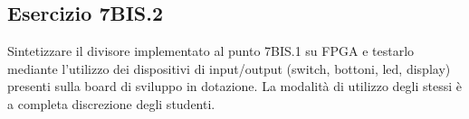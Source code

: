 \subsection{Esercizio 7BIS.2}

\begin{traccia}
	Sintetizzare il divisore implementato al punto 7BIS.1 su FPGA e testarlo mediante
	l'utilizzo dei dispositivi di input/output (switch, bottoni, led, display) presenti sulla
	board di sviluppo in dotazione. La modalità di utilizzo degli stessi è a completa
	discrezione degli studenti.
\end{traccia}

\sintesiboard
{}
